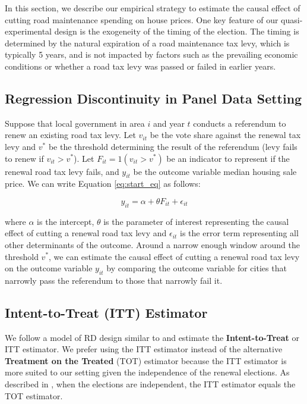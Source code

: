 In this section, we describe our empirical strategy to estimate the causal effect of cutting road maintenance spending on house prices. One key feature of our quasi-experimental design is the exogeneity of the timing of the election. The timing is determined by the natural expiration of a road maintenance tax levy, which is typically 5 years, and is not impacted by factors such as the prevailing economic conditions or whether a road tax levy was passed or failed in earlier years.

\subsection{Regression Discontinuity in Panel Data Setting}

Suppose that local government in area $i$ and year $t$ conducts a referendum to renew an existing road tax levy. Let $v_{it}$ be the vote share against the renewal tax levy and  $v^*$ be the threshold determining the result of the referendum (levy fails to renew if $v_{it} > v^*$). Let $F_{it} = 1(v_{it} > v^*)$ be an indicator to represent if the renewal road tax levy fails, and $y_{it}$ be the outcome variable median housing sale price. We can write Equation \ref{eq:start_eq} as follows:

\begin{equation}
y_{it} = \alpha + \theta F_{it} + \epsilon_{it}
\label{eq:start_eq}
\end{equation}

\noindent where $\alpha$ is the intercept, $\theta$ is the parameter of interest representing the causal effect of cutting a renewal road tax levy and $\epsilon_{it}$ is the error term representing all other determinants of the outcome. Around a narrow enough window around the threshold $v^*$, we can estimate the causal effect of cutting a renewal road tax levy on the outcome variable $y_{it}$ by comparing the outcome variable for cities that narrowly pass the referendum to those that narrowly fail it.

\subsection{Intent-to-Treat (ITT) Estimator}

We follow a model of RD design similar to \cite{cellini2010value} and estimate the {\bf Intent-to-Treat} or ITT estimator. We prefer using the ITT estimator instead of the alternative {\bf Treatment on the Treated} (TOT) estimator because the ITT estimator is more suited to our setting given the independence of the renewal elections. As described in \cite{cellini2010value}, when the elections are independent, the ITT estimator equals the TOT estimator.

